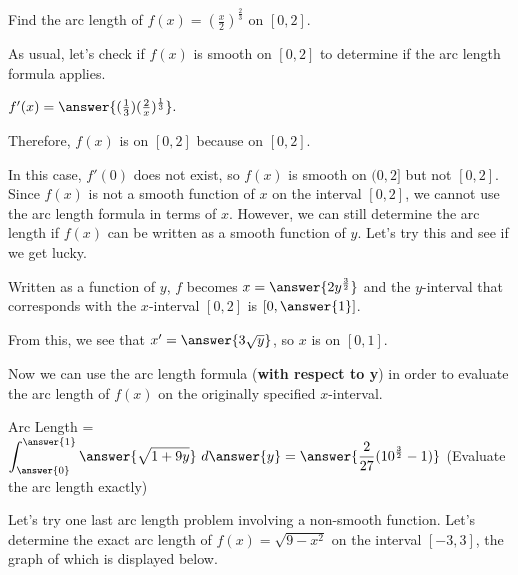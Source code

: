 \documentclass[handout,nooutcomes]{ximera}
\begin{document}
\begin{problem}
Find the arc length of $f(x) = \left(\frac{x}{2}\right)^{\frac{2}{3}}$ on $[0,2]$.  

As usual, let's check if $f(x)$ is smooth on $[0,2]$ to determine if the arc length formula applies.

$f'(x) = \answer{(\frac{1}{3})(\frac{2}{x})^{\frac{1}{3}}}.$ 

Therefore, $f(x)$ is  on $[0,2]$ because  on $[0,2]$.  

\begin{problem}
In this case, $f'(0)$ does not exist, so $f(x)$ is smooth on $(0,2]$ but not $[0,2]$.  Since $f(x)$ is not a smooth function of $x$ on the interval $[0,2]$, we cannot use the arc length formula in terms of $x$.  However, we can still determine the arc length if $f(x)$ can be written as a smooth function of $y$.  Let's try this and see if we get lucky.  

Written as a function of $y$, $f$ becomes $x = \answer{2y^{\frac{3}{2}}}$ and the $y$-interval that corresponds with the $x$-interval $[0,2]$ is $[0, \answer{1}]$.  

\begin{problem}
From this, we see that $x' = \answer{3\sqrt{y}}$, so $x$ is  on $[0,1]$.  

\begin{problem}
Now we can use the arc length formula (\textbf{with respect to y}) in order to evaluate the arc length of $f(x)$ on the originally specified $x$-interval. 

Arc Length = $\displaystyle\int_{\answer{0}}^{\answer{1}} \answer{\sqrt{1+9y}} \ d\answer{y} = \answer{\frac{2}{27}(10^{\frac{3}{2}}-1)}$ (Evaluate the arc length exactly)

\end{problem}
\end{problem}
\end{problem}
\end{problem}


Let's try one last arc length problem involving a non-smooth function.  Let's determine the exact arc length of $f(x) = \sqrt{9-x^2}$ on the interval $[-3,3]$, the graph of which is displayed below.
\end{document}
